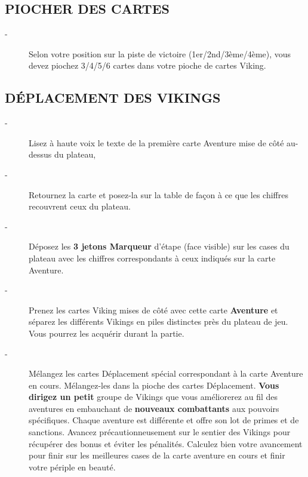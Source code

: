 \documentclass{scrartcl}%
\begin{document}
%
\subsection{ PIOCHER DES CARTES
}%
\label{subsec:PIOCHERDESCARTES}%
\begin{description}%
\item[{-} ]%
%
 Selon votre position sur la piste de victoire (1er/2nd/3ème/4ème), vous devez piochez 3/4/5/6 cartes dans votre pioche de cartes Viking.
%
\end{description}

%
\subsection{ DÉPLACEMENT DES VIKINGS
}%
\label{subsec:DPLACEMENTDESVIKINGS}%
\begin{description}%
\item[{-} ]%
%
 Lisez à haute voix le texte de la première carte Aventure mise de côté au{-}dessus du plateau,
%
\item[{-} ]%
%
 Retournez la carte et posez{-}la sur la table de façon à ce que les chiffres recouvrent ceux du plateau.
%
\item[{-} ]%
%
 Déposez les %
\textcolor{mygreen}{%
\textbf{3 jetons Marqueur}%
}%
\textit{ }%
 d'étape (face visible) sur les cases du plateau avec les chiffres correspondants à ceux indiqués sur la carte Aventure.
%
\item[{-} ]%
%
 Prenez les cartes Viking mises de côté avec cette carte %
\textcolor{mygreen}{%
\textbf{Aventure}%
}%
\textit{ }%
 et séparez les différents Vikings en piles distinctes près du plateau de jeu. Vous pourrez les acquérir durant la partie.
%
\item[{-} ]%
%
 Mélangez les cartes Déplacement spécial correspondant à la carte Aventure en cours. Mélangez{-}les dans la pioche des cartes Déplacement. %
\textcolor{mygreen}{%
\textbf{Vous dirigez un petit}%
}%
\textit{ }%
 groupe de Vikings que vous améliorerez au fil des aventures en embauchant de%
\textcolor{mygreen}{%
\textbf{ nouveaux combattants}%
}%
\textit{ }%
 aux pouvoirs spécifiques. Chaque aventure est différente et offre son lot de primes et de sanctions. Avancez précautionneusement sur le sentier des Vikings pour récupérer des bonus et éviter les pénalités. Calculez bien votre avancement pour finir sur les meilleures cases de la carte aventure en cours et finir votre périple en beauté.
%
\end{description}%
\end{document}
